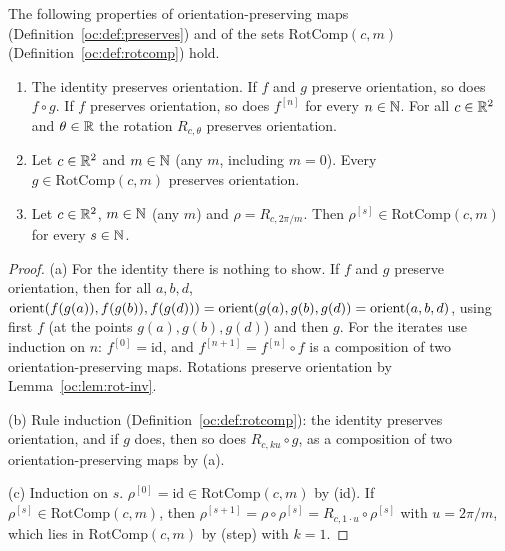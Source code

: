 \begin{lemma}\label{oc:lem:rotcomp-pres}
The following properties of orientation-preserving maps (Definition~\ref{oc:def:preserves}) and of
the sets $\mathrm{RotComp}(c,m)$ (Definition~\ref{oc:def:rotcomp}) hold.
\begin{enumerate}[label=(\alph*)]
\item The identity preserves orientation. If $f$ and $g$ preserve orientation, so does $f\circ g$. If $f$
  preserves orientation, so does $f^{[n]}$ for every $n\in\mathbb N$. For all $c\in\mathbb R^2$ and $\theta\in\mathbb R$ the
  rotation $R_{c,\theta}$ preserves orientation.
\item Let $c\in\mathbb R^2$ and $m\in\mathbb N$ (any $m$, including $m=0$). Every $g\in\mathrm{RotComp}(c,m)$ preserves
  orientation.
\item Let $c\in\mathbb R^2$, $m\in\mathbb N$ (any $m$) and $\rho=R_{c,2\pi/m}$. Then $\rho^{[s]}\in\mathrm{RotComp}(c,m)$
  for every $s\in\mathbb N$.
\end{enumerate}
\end{lemma}
\begin{proof}
(a) For the identity there is nothing to show. If $f$ and $g$ preserve orientation, then for all $a,b,d$,
$\operatorname{orient}(f(g(a)),f(g(b)),f(g(d)))=\operatorname{orient}(g(a),g(b),g(d))=\operatorname{orient}(a,b,d)$, using first $f$ (at the
points $g(a),g(b),g(d)$) and then $g$. For the iterates use induction on $n$: $f^{[0]}=\mathrm{id}$, and
$f^{[n+1]}=f^{[n]}\circ f$ is a composition of two orientation-preserving maps. Rotations preserve
orientation by Lemma~\ref{oc:lem:rot-inv}.

(b) Rule induction (Definition~\ref{oc:def:rotcomp}): the identity preserves orientation, and if $g$
does, then so does $R_{c,ku}\circ g$, as a composition of two orientation-preserving maps by (a).

(c) Induction on $s$. $\rho^{[0]}=\mathrm{id}\in\mathrm{RotComp}(c,m)$ by (id). If
$\rho^{[s]}\in\mathrm{RotComp}(c,m)$, then $\rho^{[s+1]}=\rho\circ\rho^{[s]}=R_{c,1\cdot u}\circ\rho^{[s]}$
with $u=2\pi/m$, which lies in $\mathrm{RotComp}(c,m)$ by (step) with $k=1$.
\end{proof}

